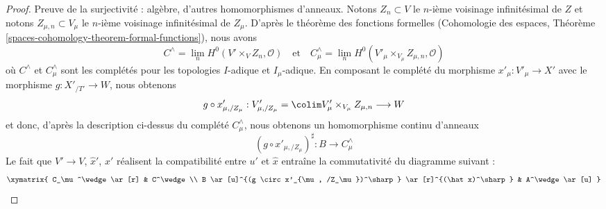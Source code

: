 \begin{proof}
\medskip\noindent
Preuve de la surjectivité : algèbre, d'autres homomorphismes d'anneaux.
Notons $Z_n \subset V$ le $n$-ième voisinage infinitésimal
de $Z$ et notons $Z_{\mu, n} \subset V_\mu$
le $n$-ième voisinage infinitésimal de $Z_\mu$.
D'après le théorème des fonctions formelles
(Cohomologie des espaces, Théorème
\ref{spaces-cohomology-theorem-formal-functions}),
nous avons
$$
C^\wedge = \lim_n H^0(V' \times_V Z_n, \mathcal{O})
\quad\text{et}\quad
C_\mu^\wedge =
\lim_n H^0(V'_\mu \times_{V_\mu} Z_{\mu, n}, \mathcal{O})
$$
où $C^\wedge$ et $C_\mu^\wedge$ sont les complétés pour
les topologies $I$-adique et $I_\mu$-adique.
En composant le complété du morphisme
$x'_\mu : V'_\mu \to X'$ avec le morphisme $g : X'_{/T'} \to W$, nous obtenons
$$
g \circ x'_{\mu, /Z_\mu} :
V'_{\mu, /Z_\mu} = \colim V_\mu' \times_{V_\mu} Z_{\mu, n}
\longrightarrow
W
$$
et donc, d'après la description ci-dessus du complété
$C_\mu^\wedge$, nous obtenons un homomorphisme continu d'anneaux
$$
(g \circ x'_{\mu, /Z_\mu})^\sharp : B \longrightarrow C_\mu^\wedge
$$
Le fait que $V' \to V$, $\hat x'$, $x'$ réalisent la compatibilité
entre $u'$ et $\hat x$ entraîne la
commutativité du diagramme suivant :
$$
\xymatrix{
C_\mu^\wedge \ar[r] &
C^\wedge \\
B \ar[u]^{(g \circ x'_{\mu, /Z_\mu})^\sharp} \ar[r]^{(\hat x)^\sharp} &
A^\wedge \ar[u]
}
$$


\end{proof}
